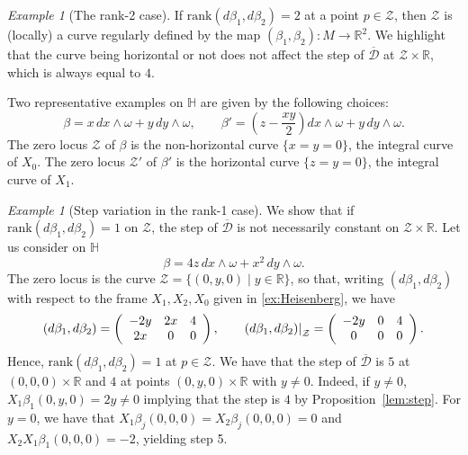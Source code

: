 \documentclass{amsart}
\theoremstyle{plain}
\theoremstyle{definition}
\theoremstyle{remark}
\newtheorem{example}[thm]{Example}
\newcommand{\R}{\mathbb{R}}
\newcommand{\diff}{d}%
\newcommand{\distr}{\mathcal{D}}								%
\newcommand{\B}{\beta}
\newcommand{\lift}[1]{\overline{#1}} 							%
\newcommand\restr[2]{{													%
  \left.\kern-\nulldelimiterspace 					
  #1 																			
  \right|_{#2} 														
  }}
\begin{document}
\begin{example}[The rank-2 case] \label{ex:rank2}
If $\mathrm{rank}\left(\diff\B_1,\diff\B_2\right)=2$ at a point $p\in \mathcal{Z}$, then $\mathcal{Z}$ is (locally) a curve regularly defined by the map $\left(\B_1,\B_2\right):M\to \R^2$.
We highlight that the curve being horizontal or not does not affect the step of $\lift \distr$ at $\mathcal{Z}\times \R$, which is always equal to $4$.

Two representative examples on $\mathbb{H}$ are given by the following choices:
\begin{equation}
\B=x\,dx\wedge\omega+y\,dy\wedge\omega, \qquad \B'=\left(z-\frac{xy}{2}\right)dx\wedge\omega+y\,dy\wedge\omega.
\end{equation} 
The zero locus $\mathcal{Z}$ of  $\B$ is the non-horizontal curve $\{x=y=0\}$, the integral curve of $X_0$. %
The zero locus $\mathcal{Z}'$ of $\B'$ is the horizontal curve $\{z=y=0\}$, the integral curve of $X_1$.
\end{example}

\begin{example}[Step variation in the rank-1 case]
\label{ex:rank1}
We show that if $\mathrm{rank}\left(\diff\B_1,\diff\B_2\right)=1$ on $\mathcal{Z}$, the step of $\lift\distr$ is not necessarily constant on $\mathcal{Z}\times\R$. 
Let us consider on $\mathbb{H}$
 \begin{equation}
 	\B=4z\,dx\wedge\omega+x^2\,dy\wedge\omega.
 \end{equation}
 The zero locus is the curve $\mathcal{Z}=\{(0,y,0)\mid y\in \R\}$, so that, writing  $ \left( \diff\B_1, \diff\B_2\right)$ with respect to the frame $X_1,X_2,X_0$ given in \cref{ex:Heisenberg}, we have
  \begin{equation}
 \left( \diff\B_1, \diff\B_2\right)=
 \left(\begin{array}{ccc}
 -2y & 2x &4 \\
 2x & 0 &0
 \end{array}\right),
 \qquad
  \restr{\left( \diff\B_1, \diff\B_2\right)}{\mathcal{Z}}=
 \left(\begin{array}{ccc}
 -2y & 0 & 4\\
 0 & 0 & 0
 \end{array}\right).
 \end{equation} 
Hence, $\mathrm{rank}\left(\diff \B_1,\diff \B_2\right)=1$ at $p\in \mathcal{Z}$.
We have that  the step of $\lift \distr$ is $5$ at $(0,0,0)\times \R$ and $4$ at points $(0,y,0)\times \R$ with $y\neq 0$. 
Indeed, if $y\neq 0$, $X_1\B_1(0,y,0)=2y\neq 0$ implying that the step is $4$ by Proposition~\ref{lem:step}. 
For $y=0$, we have that $X_1\B_j(0,0,0)=X_2\B_j(0,0,0)=0$ and $X_2X_1\B_1(0,0,0)=-2$, yielding step 5.
\end{example}
\end{document}

